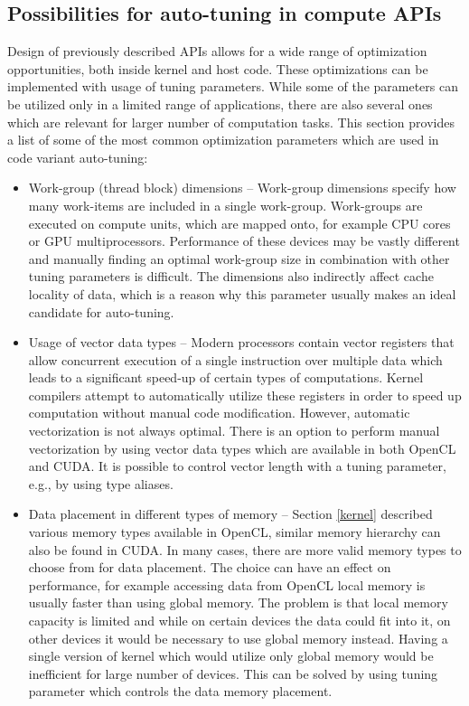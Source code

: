 \documentclass[
  digital,     %
  oneside,     %
  nosansbold,  %
  nocolorbold, %
  lof,         %
  lot,         %
  nocover
]{fithesis4}
\begin{document}
\subsection{Possibilities for auto-tuning in compute APIs}
Design of previously described APIs allows for a wide range of optimization opportunities, both inside kernel and host code. These optimizations can be implemented with usage of tuning parameters. While some of the parameters can be utilized only in a limited range of applications, there are also several ones which are relevant for larger number of computation tasks. This section provides a list of some of the most common optimization parameters which are used in code variant auto-tuning:

\begin{itemize}
	\item Work-group (thread block) dimensions -- Work-group dimensions specify how many work-items are included in a single work-group. Work-groups are executed on compute units, which are mapped onto, for example CPU cores or GPU multiprocessors. Performance of these devices may be vastly different and manually finding an optimal work-group size in combination with other tuning parameters is difficult. The dimensions also indirectly affect cache locality of data, which is a reason why this parameter usually makes an ideal candidate for auto-tuning.
	\item Usage of vector data types -- Modern processors contain vector registers that allow concurrent execution of a single instruction over multiple data which leads to a significant speed-up of certain types of computations. Kernel compilers attempt to automatically utilize these registers in order to speed up computation without manual code modification. However, automatic vectorization is not always optimal. There is an option to perform manual vectorization by using vector data types which are available in both OpenCL and CUDA. It is possible to control vector length with a tuning parameter, e.g., by using type aliases.
	\item Data placement in different types of memory -- Section \ref{kernel} described various memory types available in OpenCL, similar memory hierarchy can also be found in CUDA. In many cases, there are more valid memory types to choose from for data placement. The choice can have an effect on performance, for example accessing data from OpenCL local memory is usually faster than using global memory. The problem is that local memory capacity is limited and while on certain devices the data could fit into it, on other devices it would be necessary to use global memory instead. Having a single version of kernel which would utilize only global memory would be inefficient for large number of devices. This can be solved by using tuning parameter which controls the data memory placement.

\end{itemize}
\end{document}
